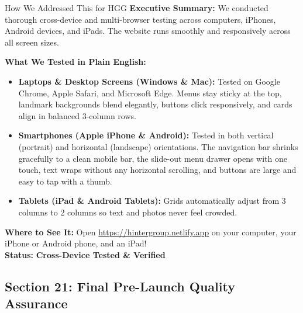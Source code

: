 \documentclass[11pt,a4paper]{article}
\begin{document}
\begin{DetailedResolutionBox}{How We Addressed This for HGG}
\textbf{Executive Summary:} We conducted thorough cross-device and multi-browser testing across computers, iPhones, Android devices, and iPads. The website runs smoothly and responsively across all screen sizes.

\textbf{What We Tested in Plain English:}
\begin{itemize}
    \item \textbf{Laptops \& Desktop Screens (Windows \& Mac):} Tested on Google Chrome, Apple Safari, and Microsoft Edge. Menus stay sticky at the top, landmark backgrounds blend elegantly, buttons click responsively, and cards align in balanced 3-column rows.
    \item \textbf{Smartphones (Apple iPhone \& Android):} Tested in both vertical (portrait) and horizontal (landscape) orientations. The navigation bar shrinks gracefully to a clean mobile bar, the slide-out menu drawer opens with one touch, text wraps without any horizontal scrolling, and buttons are large and easy to tap with a thumb.
    \item \textbf{Tablets (iPad \& Android Tablets):} Grids automatically adjust from 3 columns to 2 columns so text and photos never feel crowded.
\end{itemize}

\textbf{Where to See It:} Open \url{https://hintergroup.netlify.app} on your computer, your iPhone or Android phone, and an iPad! \\
\textbf{Status:} \textcolor{HGGGreen}{\textbf{Cross-Device Tested \& Verified}}
\end{DetailedResolutionBox}

\vspace{0.3cm}

\subsection{Section 21: Final Pre-Launch Quality Assurance}
\end{document}
